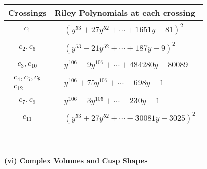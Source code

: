 \documentclass[1p]{elsarticle_modified}
\theoremstyle{definition}
\begin{document}
\begin{tabular}{m{50pt}|m{274pt}}
Crossings & \hspace{64pt}Riley Polynomials at each crossing \\
\hline $$\begin{aligned}c_{1}\end{aligned}$$&$\begin{aligned}
&(y^{53}+27 y^{52}+\cdots+1651 y-81)^{2}
\end{aligned}$\\
\hline $$\begin{aligned}c_{2},c_{6}\end{aligned}$$&$\begin{aligned}
&(y^{53}-21 y^{52}+\cdots+187 y-9)^{2}
\end{aligned}$\\
\hline $$\begin{aligned}c_{3},c_{10}\end{aligned}$$&$\begin{aligned}
&y^{106}-9 y^{105}+\cdots+484280 y+80089
\end{aligned}$\\
\hline $$\begin{aligned}c_{4},c_{5},c_{8}\\c_{12}\end{aligned}$$&$\begin{aligned}
&y^{106}+75 y^{105}+\cdots-698 y+1
\end{aligned}$\\
\hline $$\begin{aligned}c_{7},c_{9}\end{aligned}$$&$\begin{aligned}
&y^{106}-3 y^{105}+\cdots-230 y+1
\end{aligned}$\\
\hline $$\begin{aligned}c_{11}\end{aligned}$$&$\begin{aligned}
&(y^{53}+27 y^{52}+\cdots-30081 y-3025)^{2}
\end{aligned}$\\
\hline
\end{tabular}\\~\\
\newpage\flushleft \textbf{(vi) Complex Volumes and Cusp Shapes}
\end{document}
